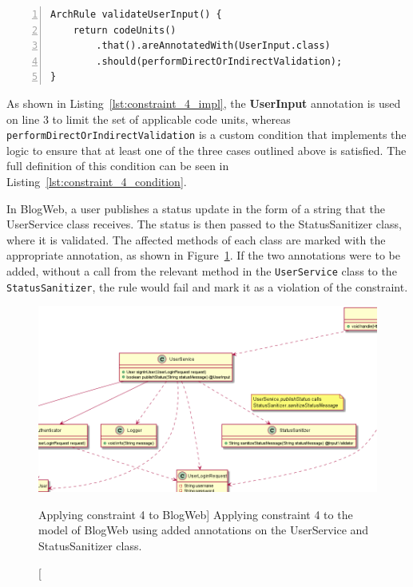 \begin{minipage}{\linewidth}
\begin{lstlisting}[caption={Rule definition for constraint 4.}, captionpos=b, label=lst:constraint_4_impl, numbers=left]
ArchRule validateUserInput() {
    return codeUnits()
        .that().areAnnotatedWith(UserInput.class)
        .should(performDirectOrIndirectValidation);
}
\end{lstlisting}
\end{minipage}

As shown in Listing~\ref{lst:constraint_4_impl}, the \textbf{UserInput} annotation is used on line 3 to limit the set of applicable code units, whereas \texttt{performDirectOrIndirect\-Validation} is a custom condition that implements the logic to ensure that at least one of the three cases outlined above is satisfied. The full definition of this condition can be seen in Listing~\ref{lst:constraint_4_condition}.

In BlogWeb, a user publishes a status update in the form of a string that the UserService class receives. The status is then passed to the StatusSanitizer class, where it is validated. The affected methods of each class are marked with the appropriate annotation, as shown in Figure~\ref{fig:validate_input_toy_system}. If the two annotations were to be added, without a call from the relevant method in the \texttt{UserService} class to the \texttt{StatusSanitizer}, the rule would fail and mark it as a violation of the constraint.

\begin{figure}
    \centering
    \includegraphics[width=\textwidth]{figure/toyexamples/validate_input_toy_system.png}
    \caption
        [Applying constraint 4 to BlogWeb]
        {Applying constraint 4 to the model of BlogWeb using added annotations on the UserService and StatusSanitizer class.}
    \label{fig:validate_input_toy_system}
\end{figure}

